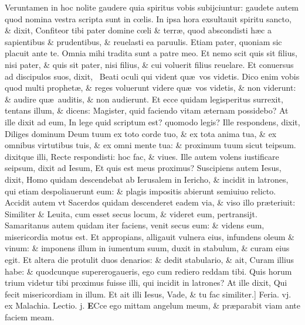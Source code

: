 \documentclass[a5paper,10pt]{book}
\def\leftmarginnote{%
	\lrmarginnote{\hskip -\marginparsep \hskip -6.5em}}
\def\rightmarginnote{%
	\lrmarginnote{\hskip\columnwidth \hskip -1em}}
\def\ae{æ}
\def\oe{œ}
\begin{document}
\begin{multicols*}{2}
Veruntamen in hoc nolite gaudere quia spiritus vobis subijciuntur: gaudete autem quod nomina vestra scripta sunt in c\oe lis.
In ipsa hora exsultauit spiritu sancto, \& dixit, Confiteor tibi pater domine c\oe li \& terr\ae , quod abscondisti h\ae c a sapientibus \& prudentibus, \& reuelasti ea paruulis. Etiam pater, quoniam sic placuit ante te.
Omnia mihi tradita sunt a patre meo. Et nemo scit quis sit filius, nisi pater, \& quis sit pater, nisi filius, \& cui voluerit filius reuelare.
Et conuersus ad discipulos suos, dixit, \textdagger \ Beati\rightmarginnote{D} oculi qui vident qu\ae \ vos videtis.
Dico enim vobis quod multi prophet\ae , \& reges voluerunt videre qu\ae \ vos videtis, \& non viderunt: \& audire qu\ae \ auditis, \& non audierunt.
Et ecce quidam legisperitus surrexit, tentans illum, \& dicens: Magister, quid faciendo vitam \ae ternam possidebo?
At ille dixit ad eum, In lege quid scriptum est? quomodo legis?
Ille respondens, dixit, Diliges dominum Deum tuum ex toto corde tuo, \& ex tota anima tua, \& ex omnibus virtutibus tuis, \& ex omni mente tua: \& proximum tuum sicut teipsum. dixitque illi, Recte respondisti: hoc fac, \& viues.
Ille autem volens iustificare seipsum, dixit ad Iesum, Et quis est meus proximus?
Suscipiens autem Iesus, dixit, Homo quidam descendebat ab Ierusalem in Iericho, \& incidit in latrones, qui
etiam despoliauerunt eum: \& plagis impositis abierunt semiuiuo relicto.
Accidit autem vt Sacerdos quidam descenderet eadem via, \& viso illo pr\ae teriuit: Similiter \& Leuita, cum esset secus locum, \& videret eum, pertransijt.
Samaritanus autem quidam iter faciens, venit secus eum: \& videns eum, misericordia motus est.
Et appropians, alligauit vulnera eius, infundens oleum \& vinum: \& imponens illum in iumentum suum, duxit in stabulum, \& curam eius egit.
Et altera die protulit duos denarios: \& dedit stabulario, \& ait, Curam illius habe: \& quodcunque supererogaueris, ego cum rediero reddam tibi.
Quis horum trium videtur tibi proximus fuisse illi, qui incidit in latrones?
At ille dixit, Qui fecit misericordiam in illum. Et ait illi Iesus, Vade, \& tu fac similiter.]
\newline {} \color{red} \hypertarget{FRI-QVARTA-ADV}{Feria. vj.} ex Malachia. \hfill Lectio. j. \color{black}%
\vspace{-.25em}
\lettrine[lines=2]{\bfseries E}{}\textdagger Cce\leftmarginnote{\begin{flushright}c.3.a\end{flushright}} ego mittam angelum meum, \& pr\ae parabit viam ante faciem meam.

\end{multicols*}
\end{document}
